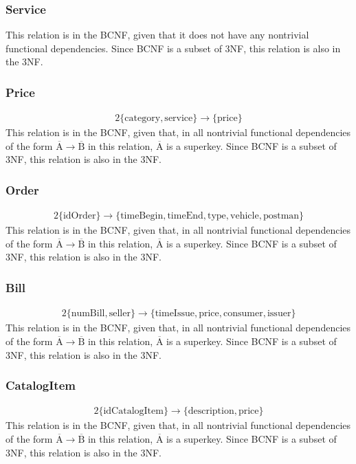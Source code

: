 \documentclass{report}[a4paper]
\theoremstyle{remark}
\begin{document}
\subsubsection{Service}
This relation is in the BCNF, given that it does not have any nontrivial functional dependencies. Since BCNF is a subset of 3NF, this relation is also in the 3NF.
\subsubsection{Price}
\begin{alignat*}{2}
\{\text{category},\text{service}\} \rightarrow \{\text{price}\}
\end{alignat*}
This relation is in the BCNF, given that, in all nontrivial functional dependencies of the form $\overline{\text{A}} \rightarrow \overline{\text{B}}$ in this relation, $\overline{\text{A}}$ is a superkey. Since BCNF is a subset of 3NF, this relation is also in the 3NF.
\subsubsection{Order}
\begin{alignat*}{2}
\{\text{idOrder}\} \rightarrow \{\text{timeBegin},\text{timeEnd},\text{type},\text{vehicle},\text{postman}\}
\end{alignat*}
This relation is in the BCNF, given that, in all nontrivial functional dependencies of the form $\overline{\text{A}} \rightarrow \overline{\text{B}}$ in this relation, $\overline{\text{A}}$ is a superkey. Since BCNF is a subset of 3NF, this relation is also in the 3NF.
\subsubsection{Bill}
\begin{alignat*}{2}
\{\text{numBill},\text{seller}\} \rightarrow \{\text{timeIssue},\text{price},\text{consumer},\text{issuer}\}
\end{alignat*}
This relation is in the BCNF, given that, in all nontrivial functional dependencies of the form $\overline{\text{A}} \rightarrow \overline{\text{B}}$ in this relation, $\overline{\text{A}}$ is a superkey. Since BCNF is a subset of 3NF, this relation is also in the 3NF.
\subsubsection{CatalogItem}
\begin{alignat*}{2}
\{\text{idCatalogItem}\} \rightarrow \{\text{description},\text{price}\}
\end{alignat*}
This relation is in the BCNF, given that, in all nontrivial functional dependencies of the form $\overline{\text{A}} \rightarrow \overline{\text{B}}$ in this relation, $\overline{\text{A}}$ is a superkey. Since BCNF is a subset of 3NF, this relation is also in the 3NF.
\end{document}
